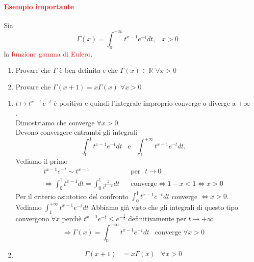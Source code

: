 \documentclass{article}
\newcommand{\R}{\mathbb{R}}
\begin{document}
\paragraph{\textcolor{red}{Esempio importante}}
Sia 
\begin{equation*}
    \Gamma(x)=\int_{0}^{+\infty}t^{x-1}e^{-t}dt, \,\,\,\,\, x>0
\end{equation*}
la \textcolor{red}{funzione gamma di Eulero}.
\begin{enumerate}
    \item Provare che $\Gamma$ è ben definita e che $\Gamma(x)\in\R\,\,\forall x>0$
    \item Provare che $\Gamma(x+1)=x\Gamma(x)\,\,\forall x > 0$
\end{enumerate}
\begin{enumerate}
    \item $t \mapsto t^{x-1}e^{-t}$ è positiva e quindi l'integrale improprio converge o diverge a $+\infty$.\\
    Dimostriamo che converge $\forall x>0$.\\
    Devono convergere entrambi gli integrali
    \begin{equation*}
        \int_{0}^{1}t^{x-1}e^{-t}dt \,\,\,\,\, \text{e}\,\,\,\,\, \int_{1}^{+\infty}t^{x-1}e^{-t}dt.
    \end{equation*}
    Vediamo il primo
    \begin{align*}
        t^{x-1}e^{-t} \sim t^{x-1} \,\,\,\,\, &\text{per}\,\,\,\,t \rightarrow 0\\
        \Rightarrow \int_{0}^{1}t^{x-1}dt =\int_{0}^{1}\frac{1}{t^{1-x}}dt \,\,\,\,\, &\text{converge} \Leftrightarrow 1-x<1\Leftrightarrow x>0
    \end{align*}
    Per il criterio asintotico del confronto $\int_{0}^{1}t^{x-1}e^{-t}dt$ converge $\Leftrightarrow x>0$.\\
    Vediamo $\int_{1}^{+\infty}t^{x-1}e^{-t}dt$
    Abbiamo già visto che gli integrali di questo tipo convergono $\forall x$ perchè $t^{x-1}e^{-t}\leq e^{-\frac{t}{2}}$ definitivamente per $t\rightarrow +\infty$\\
    \begin{equation*}
        \Rightarrow \Gamma(x)=\int_{0}^{+\infty}t^{x-1}e^{-t}dt\,\,\,\,\, \text{converge} \,\,\forall x >0
    \end{equation*}
    \item 
    \begin{align*}
        \Gamma(x+1) &= x\Gamma(x)\,\,\,\,\, \forall x>0\\

\end{align*}
\end{enumerate}
\end{document}
